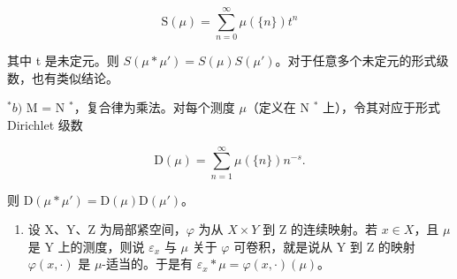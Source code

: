 \[
\mathrm{S} (\mu) = \sum_ {n = 0} ^ {\infty} \mu (\{n \}) t ^ {n}
\]

其中 t 是未定元。则 \(S(\mu * \mu') = S(\mu)S(\mu')\)。对于任意多个未定元的形式级数，也有类似结论。

\(^{*}b)\) M = N \(^{*}\)，复合律为乘法。对每个测度 \(\mu\)（定义在 N \(^{*}\) 上），令其对应于形式 Dirichlet 级数

\[
\mathrm{D} (\mu) = \sum_ {n = 1} ^ {\infty} \mu (\{n \}) n ^ {- s}.
\]

则 \(\mathrm{D}(\mu * \mu') = \mathrm{D}(\mu) \mathrm{D}(\mu')\)。

\begin{enumerate}
\def\labelenumi{\arabic{enumi})}
\setcounter{enumi}{2}
\tightlist
\item
  设 X、Y、Z 为局部紧空间，\(\varphi\) 为从 \(X \times Y\) 到 Z 的连续映射。若 \(x \in X\)，且 \(\mu\) 是 Y 上的测度，则说 \(\varepsilon_{x}\) 与 \(\mu\) 关于 \(\varphi\) 可卷积，就是说从 Y 到 Z 的映射 \(\varphi(x,\cdot)\) 是 \(\mu\)-适当的。于是有 \(\varepsilon_{x} * \mu = \varphi(x,\cdot)(\mu)\)。
\end{enumerate}


